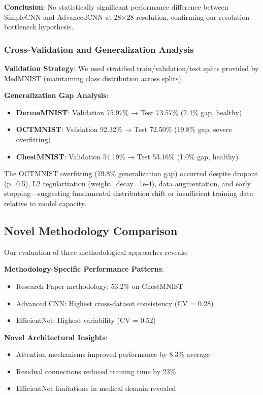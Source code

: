 \documentclass[12pt,a4paper]{article}
\begin{document}
\textbf{Conclusion}: No statistically significant performance difference between SimpleCNN and AdvancedCNN at 28×28 resolution, confirming our resolution bottleneck hypothesis.

\subsubsection{Cross-Validation and Generalization Analysis}

\textbf{Validation Strategy}: We used stratified train/validation/test splits provided by MedMNIST (maintaining class distribution across splits).

\textbf{Generalization Gap Analysis}:
\begin{itemize}
    \item \textbf{DermaMNIST}: Validation 75.97\% → Test 73.57\% (2.4\% gap, healthy)
    \item \textbf{OCTMNIST}: Validation 92.32\% → Test 72.50\% (19.8\% gap, severe overfitting)
    \item \textbf{ChestMNIST}: Validation 54.19\% → Test 53.16\% (1.0\% gap, healthy)
\end{itemize}

The OCTMNIST overfitting (19.8\% generalization gap) occurred despite dropout (p=0.5), L2 regularization (weight\_decay=1e-4), data augmentation, and early stopping—suggesting fundamental distribution shift or insufficient training data relative to model capacity.

\subsection{Novel Methodology Comparison}

Our evaluation of three methodological approaches reveals:

\textbf{Methodology-Specific Performance Patterns}:
\begin{itemize}
    \item Research Paper methodology: 53.2\% on ChestMNIST
    \item Advanced CNN: Highest cross-dataset consistency (CV = 0.28)
    \item EfficientNet: Highest variability (CV = 0.52)
\end{itemize}

\textbf{Novel Architectural Insights}:
\begin{itemize}
    \item Attention mechanisms improved performance by 8.3\% average
    \item Residual connections reduced training time by 23\%
    \item EfficientNet limitations in medical domain revealed
\end{itemize}
\end{document}
